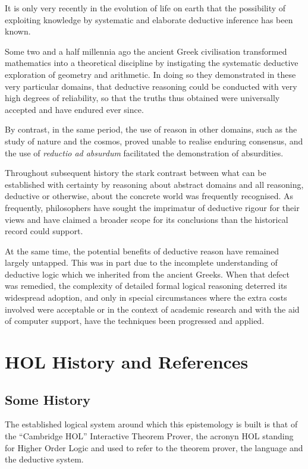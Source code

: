 \documentclass[10pt,titlepage]{book}
\begin{document}
It is only very recently in the evolution of life on earth that the possibility of exploiting knowledge by systematic and elaborate deductive inference has been known.

Some two and a half millennia ago the ancient Greek civilisation transformed mathematics into a theoretical discipline by instigating the systematic deductive exploration of geometry and arithmetic.
In doing so they demonstrated in these very particular domains, that deductive reasoning could be conducted with very high degrees of reliability, so that the truths thus obtained were universally accepted and have endured ever since.

By contrast, in the same period, the use of reason in other domains, such as the study of nature and the cosmos, proved unable to realise enduring consensus, and the use of \emph{reductio ad absurdum} facilitated the demonstration of absurdities.

Throughout subsequent history the stark contrast between what can be established with certainty by reasoning about abstract domains and all reasoning, deductive or otherwise, about the concrete world was frequently recognised.
As frequently, philosophers have sought the imprimatur of deductive rigour for their views and have claimed a broader scope for its conclusions than the historical record could support.

At the same time, the potential benefits of deductive reason have remained largely untapped.
This was in part due to the incomplete understanding of deductive logic which we inherited from the ancient Greeks.
When that defect was remedied, the complexity of detailed formal logical reasoning deterred its widespread adoption, and only in special circumstances where the extra costs involved were acceptable or in the context of academic research and with the aid of computer support, have the techniques been progressed and applied.


\section{HOL History and References}

\subsection{Some History}

The established logical system around which this epistemology is built is that of the ``Cambridge HOL'' Interactive Theorem Prover, the acronyn HOL standing for Higher Order Logic and used to refer to the theorem prover, the language and the deductive system.
\end{document}
